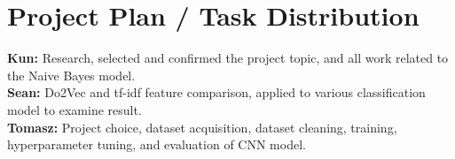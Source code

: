 \documentclass[journal,12pt,onecolumn]{IEEEtran}
\begin{document}


\section{Project Plan / Task Distribution}

\noindent\textbf{Kun:} Research, selected and confirmed the project topic, and all work related to the Naive Bayes model. \\
\textbf{Sean:} Do2Vec and tf-idf feature comparison, applied to various classification model to examine result. \\
\textbf{Tomasz:} Project choice, dataset acquisition, dataset cleaning, training, hyperparameter tuning, and evaluation of CNN model. \\




\printbibliography
\end{document}
